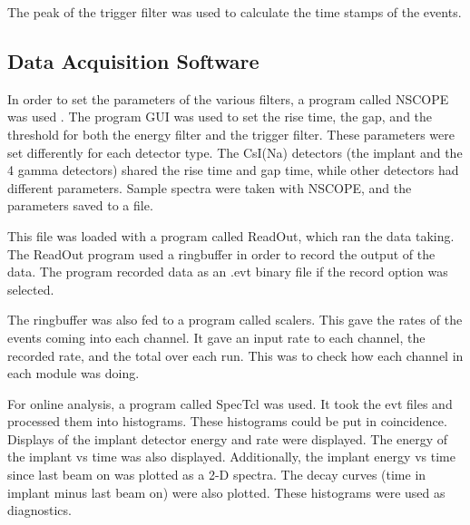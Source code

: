 \documentclass[main.tex]{subfiles}
\begin{document}
%
\begin{table}[!hbt]
	\centering
	\caption{Trigger Filter Parameters}
			\label{tab:trigfilter}
\end{table}
%

The peak of the trigger filter was used to calculate the time stamps of the events.  

\subsection{Data Acquisition Software}
In order to set the parameters of the various filters, a program called NSCOPE was used \cite{DAQ17}.
The program GUI was used to set the rise time, the gap, and the threshold for both the energy filter and the trigger filter.
These parameters were set differently for each detector type.
The CsI(Na) detectors (the implant and the 4 gamma detectors) shared the rise time and gap time, while other detectors had different parameters.
Sample spectra were taken with NSCOPE, and the parameters saved to a file.

This file was loaded with a program called ReadOut, which ran the data taking.
The ReadOut program used a ringbuffer in order to record the output of the data.
The program recorded data as an .evt binary file if the record option was selected.

The ringbuffer was also fed to a program called scalers.
This gave the rates of the events coming into each channel.
It gave an input rate to each channel, the recorded rate, and the total over each run.
This was to check how each channel in each module was doing.

For online analysis, a program called SpecTcl was used.
It took the evt files and processed them into histograms.
These histograms could be put in coincidence.
Displays of the implant detector energy and rate were displayed.
The energy of the implant vs time was also displayed.
Additionally, the implant energy vs time since last beam on was plotted as a 2-D spectra.
The decay curves (time in implant minus last beam on) were also plotted.
These histograms were used as diagnostics. 
\end{document}
